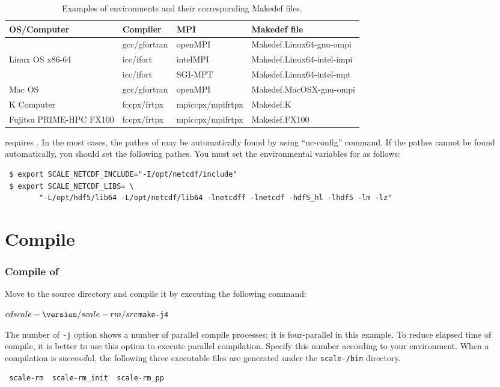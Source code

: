\begin{table}[htb]
\begin{center}
\caption{Examples of environments and their corresponding Makedef files.}
\begin{tabularx}{150mm}{|l|l|X|l|} \hline
 \rowcolor[gray]{0.9} OS/Computer & Compiler & MPI & Makedef file \\ \hline
                 & gcc/gfortran & openMPI  & Makedef.Linux64-gnu-ompi \\ \cline{2-4}
 Linux OS x86-64 & icc/ifort    & intelMPI & Makedef.Linux64-intel-impi \\ \cline{2-4}
                 & icc/ifort    & SGI-MPT  & Makedef.Linux64-intel-mpt \\ \hline
 Mac OS          & gcc/gfortran & openMPI  & Makedef.MacOSX-gnu-ompi \\ \hline
 K Computer      & fccpx/frtpx  & mpiccpx/mpifrtpx & Makedef.K \\ \hline
 Fujitsu PRIME-HPC FX100 & fccpx/frtpx & mpiccpx/mpifrtpx & Makedef.FX100 \\ \hline
\end{tabularx}
\label{tab:makedef}
\end{center}
\end{table}


\scalelib requires \netcdf.
In the most cases, the pathes of \netcdf may be automatically found by using ``nc-config'' command.
If the pathes cannot be found automatically, you should set the following pathes.
You must set the environmental variables for \netcdf as follows:
\begin{verbatim}
 $ export SCALE_NETCDF_INCLUDE="-I/opt/netcdf/include"
 $ export SCALE_NETCDF_LIBS= \
        "-L/opt/hdf5/lib64 -L/opt/netcdf/lib64 -lnetcdff -lnetcdf -hdf5_hl -lhdf5 -lm -lz"
\end{verbatim}


\section{Compile} %

\subsubsection{Compile of \scalerm} %

Move to the \scalerm source directory
and compile it by executing the following command:
\begin{alltt}
 $ cd scale-{\version}/scale-rm/src
 $ make -j 4
\end{alltt}
The number of \verb|-j| option shows a number of parallel compile processes;
it is four-parallel in this example.
To reduce elapsed time of compile,
it is better to use this option to execute parallel compilation.
Specify this number according to your environment.
When a compilation is successful,
the following three executable files are generated under the \texttt{scale-{\version}/bin} directory.
\begin{verbatim}
 scale-rm  scale-rm_init  scale-rm_pp
\end{verbatim}


